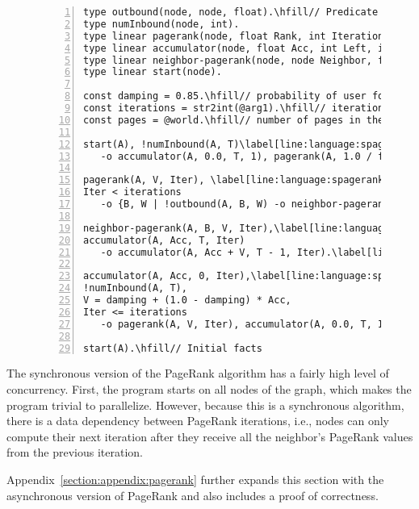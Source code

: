 \begin{figure}[h!]
\begin{Verbatim}[numbers=left,fontsize=\codesize,commandchars=\\\[\]]
type outbound(node, node, float).\hfill// Predicate declaration
type numInbound(node, int).
type linear pagerank(node, float Rank, int Iteration).
type linear accumulator(node, float Acc, int Left, int Iteration).
type linear neighbor-pagerank(node, node Neighbor, float Rank, int Iteration).
type linear start(node).

const damping = 0.85.\hfill// probability of user following a link in the current page\label[line:language:spagerank_const1]
const iterations = str2int(@arg1).\hfill// iterations to compute
const pages = @world.\hfill// number of pages in the graph.\label[line:language:spagerank_const2]

start(A), !numInbound(A, T)\label[line:language:spagerank_first1]\hfill// Rule 1: initialize pagerank and accumulator
   -o accumulator(A, 0.0, T, 1), pagerank(A, 1.0 / float(pages), 0).\label[line:language:spagerank_first2]

pagerank(A, V, Iter), \label[line:language:spagerank_second1]\hfill// Rule 2: propagate pagerank
Iter < iterations
   -o {B, W | !outbound(A, B, W) -o neighbor-pagerank(B, A, V * W, Iter + 1)}.\label[line:language:spagerank_second2]

neighbor-pagerank(A, B, V, Iter),\label[line:language:spagerank_fourth1]\hfill// Rule 3: accumulate neighbor's value
accumulator(A, Acc, T, Iter)
   -o accumulator(A, Acc + V, T - 1, Iter).\label[line:language:spagerank_fourth2]

accumulator(A, Acc, 0, Iter),\label[line:language:spagerank_third1]\hfill// Rule 4: generate new pagerank
!numInbound(A, T),
V = damping + (1.0 - damping) * Acc,
Iter <= iterations
   -o pagerank(A, V, Iter), accumulator(A, 0.0, T, Iter + 1).\label[line:language:spagerank_third2]
	
start(A).\hfill// Initial facts
\end{Verbatim}
\label{language:code:pagerank}
\end{figure}

The synchronous version of the PageRank algorithm has a fairly high level of
concurrency. First, the program starts on all nodes of the graph, which makes
the program trivial to parallelize. However, because this is a synchronous
algorithm, there is a data dependency between PageRank iterations, i.e., nodes
can only compute their next iteration after they receive all the neighbor's
PageRank values from the previous iteration.

Appendix~\ref{section:appendix:pagerank} further expands this section with the
asynchronous version of PageRank and also includes a proof of correctness.
